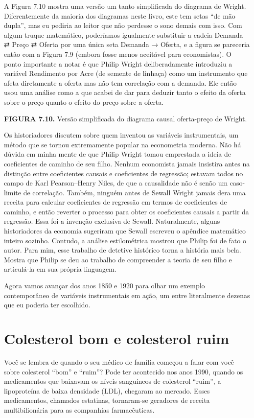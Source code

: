 \documentclass[11pt,a5paper,twoside]{book}
\begin{document}
A Figura 7.10 mostra uma versão um tanto simplificada do diagrama de Wright. Diferentemente da maioria dos diagramas neste livro, este tem setas “de mão dupla”, mas eu pediria ao leitor que não perdesse o sono demais com isso. Com algum truque matemático, poderíamos igualmente substituir a cadeia Demanda ⇄ Preço ⇄ Oferta por uma única seta Demanda → Oferta, e a figura se pareceria então com a Figura 7.9 (embora fosse menos aceitável para economistas). O ponto importante a notar é que Philip Wright deliberadamente introduziu a variável Rendimento por Acre (de semente de linhaça) como um instrumento que afeta diretamente a oferta mas não tem correlação com a demanda. Ele então usou uma análise como a que acabei de dar para deduzir tanto o efeito da oferta sobre o preço quanto o efeito do preço sobre a oferta.

\textbf{FIGURA 7.10.} Versão simplificada do diagrama causal oferta-preço de Wright.

Os historiadores discutem sobre quem inventou as variáveis instrumentais, um método que se tornou extremamente popular na econometria moderna. Não há dúvida em minha mente de que Philip Wright tomou emprestada a ideia de coeficientes de caminho de seu filho. Nenhum economista jamais insistira antes na distinção entre coeficientes causais e coeficientes de regressão; estavam todos no campo de Karl Pearson–Henry Niles, de que a causalidade não é senão um caso-limite de correlação. Também, ninguém antes de Sewall Wright jamais dera uma receita para calcular coeficientes de regressão em termos de coeficientes de caminho, e então reverter o processo para obter os coeficientes causais a partir da regressão. Essa foi a invenção exclusiva de Sewall. Naturalmente, alguns historiadores da economia sugeriram que Sewall escreveu o apêndice matemático inteiro sozinho. Contudo, a análise estilométrica mostrou que Philip foi de fato o autor. Para mim, esse trabalho de detetive histórico torna a história mais bela. Mostra que Philip se deu ao trabalho de compreender a teoria de seu filho e articulá-la em sua própria linguagem.

Agora vamos avançar dos anos 1850 e 1920 para olhar um exemplo contemporâneo de variáveis instrumentais em ação, um entre literalmente dezenas que eu poderia ter escolhido.

\section{Colesterol bom e colesterol ruim}
Você se lembra de quando o seu médico de família começou a falar com você sobre colesterol “bom” e “ruim”? Pode ter acontecido nos anos 1990, quando os medicamentos que baixavam os níveis sanguíneos de colesterol “ruim”, a lipoproteína de baixa densidade (LDL), chegaram ao mercado. Esses medicamentos, chamados estatinas, tornaram-se geradores de receita multibilionária para as companhias farmacêuticas.
\end{document}
